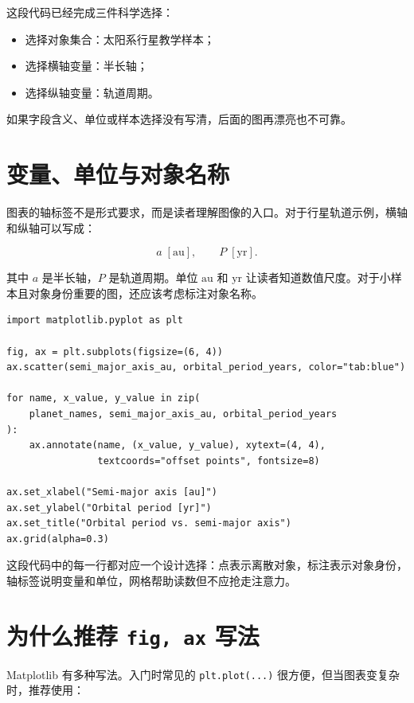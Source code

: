 这段代码已经完成三件科学选择：

\begin{itemize}
    \item 选择对象集合：太阳系行星教学样本；
    \item 选择横轴变量：半长轴；
    \item 选择纵轴变量：轨道周期。
\end{itemize}

如果字段含义、单位或样本选择没有写清，后面的图再漂亮也不可靠。

\section{变量、单位与对象名称}

图表的轴标签不是形式要求，而是读者理解图像的入口。对于行星轨道示例，横轴和纵轴可以写成：

\[
a\;[\mathrm{au}], \qquad P\;[\mathrm{yr}].
\]

其中 \(a\) 是半长轴，\(P\) 是轨道周期。单位 \(\mathrm{au}\) 和 \(\mathrm{yr}\) 让读者知道数值尺度。对于小样本且对象身份重要的图，还应该考虑标注对象名称。

\begin{examplebox}[最小散点图]
\begin{lstlisting}[style=pythonstyle]
import matplotlib.pyplot as plt

fig, ax = plt.subplots(figsize=(6, 4))
ax.scatter(semi_major_axis_au, orbital_period_years, color="tab:blue")

for name, x_value, y_value in zip(
    planet_names, semi_major_axis_au, orbital_period_years
):
    ax.annotate(name, (x_value, y_value), xytext=(4, 4),
                textcoords="offset points", fontsize=8)

ax.set_xlabel("Semi-major axis [au]")
ax.set_ylabel("Orbital period [yr]")
ax.set_title("Orbital period vs. semi-major axis")
ax.grid(alpha=0.3)
\end{lstlisting}
\end{examplebox}

这段代码中的每一行都对应一个设计选择：点表示离散对象，标注表示对象身份，轴标签说明变量和单位，网格帮助读数但不应抢走注意力。

\section{为什么推荐 \texttt{fig, ax} 写法}

Matplotlib 有多种写法。入门时常见的 \texttt{plt.plot(...)} 很方便，但当图表变复杂时，推荐使用：

